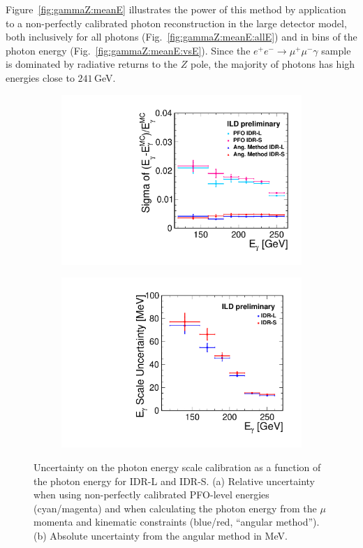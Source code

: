Figure~\ref{fig:gammaZ:meanE} illustrates the power of this method by application to a non-perfectly calibrated photon reconstruction in the large detector model, both inclusively for all photons (Fig.~\ref{fig:gammaZ:meanE:allE}) and in bins of the photon energy (Fig.~\ref{fig:gammaZ:meanE:vsE}). Since the $e^+e^- \to \mu^+\mu^-\gamma$ sample
is dominated by radiative returns to the $Z$ pole, the majority of photons has high energies close to $241$\,GeV.

\begin{figure}[htbp]
\begin{subfigure}{0.49\hsize} 
 \includegraphics[width=\textwidth]{Performance/fig/IDR4EResolutionE.pdf}
 \caption{ \label{fig:gammaZ:sigmaE:rel}}
 \end{subfigure}
\begin{subfigure}{0.49\hsize} 
 \includegraphics[width=\textwidth]{Performance/fig/IDR6EScaleUncertainty.pdf}
 \caption{  \label{fig:gammaZ:sigmaE:abs}}
 \end{subfigure}
\caption{Uncertainty on the photon energy scale calibration as a function of the photon energy for IDR-L and IDR-S.
(a) Relative uncertainty when using non-perfectly calibrated PFO-level energies (cyan/magenta) and when calculating the photon energy from the $\mu$ momenta and kinematic constraints (blue/red, ``angular method'').
(b) Absolute uncertainty from the angular method in MeV.
}
\label{fig:gammaZ:sigmaE}
\end{figure}

